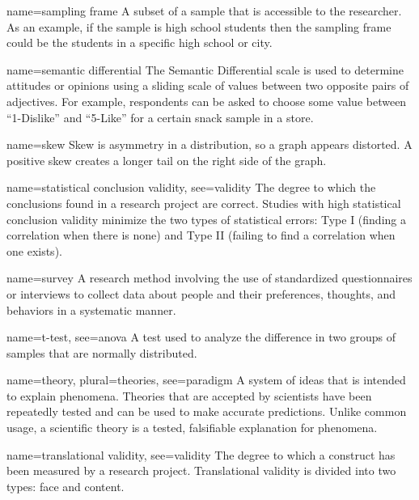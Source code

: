 {name={sampling frame}}
{%
	A subset of a sample that is accessible to the researcher. As an example, if the sample is high school students then the sampling frame could be the students in a specific high school or city. 
}

{name={semantic differential}}
{%
	The Semantic Differential scale is used to determine attitudes or opinions using a sliding scale of values between two opposite pairs of adjectives. For example, respondents can be asked to choose some value between ``1-Dislike'' and ``5-Like'' for a certain snack sample in a store.
}


{name={skew}}
{%
	Skew is asymmetry in a distribution, so a graph appears distorted. A positive skew creates a longer tail on the right side of the graph.
}

{name={statistical conclusion validity},
	see={validity}}
{%
	The degree to which the conclusions found in a research project are correct. Studies with high statistical conclusion validity minimize the two types of statistical errors: Type I (finding a correlation when there is none) and Type II (failing to find a correlation when one exists). 
}

{name={survey}}
{%
	A research method involving the use of standardized questionnaires or interviews to collect data about people and their preferences, thoughts, and behaviors in a systematic manner. 
}

{name={t-test},
	see={anova}}
{%
	A test used to analyze the difference in two groups of samples that are normally distributed.
}

{name={theory},
	plural={theories},
	see={paradigm}}
{%
	A system of ideas that is intended to explain phenomena. Theories that are accepted by scientists have been repeatedly tested and can be used to make accurate predictions. Unlike common usage, a scientific theory is a tested, falsifiable explanation for phenomena.
}

{name={translational validity},
	see={validity}}
{%
	The degree to which a construct has been measured by a research project. Translational validity is divided into two types: face and content.
}

